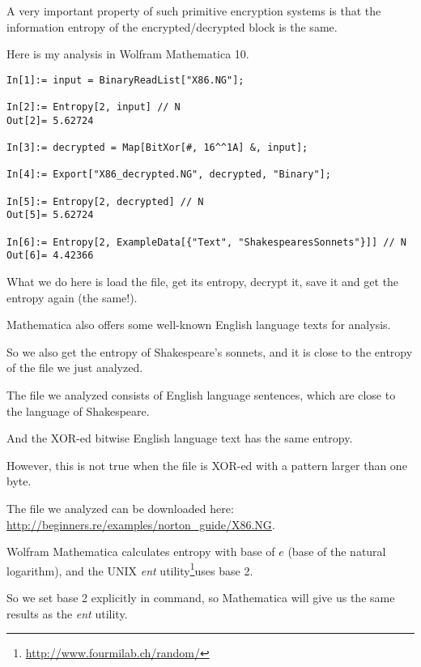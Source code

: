 A very important property of such primitive encryption systems is that the information entropy
of the encrypted/decrypted block is the same.

Here is my analysis in Wolfram Mathematica 10.

\begin{lstlisting}[caption=Wolfram Mathematica 10,style=custommath]
In[1]:= input = BinaryReadList["X86.NG"];

In[2]:= Entropy[2, input] // N
Out[2]= 5.62724

In[3]:= decrypted = Map[BitXor[#, 16^^1A] &, input];

In[4]:= Export["X86_decrypted.NG", decrypted, "Binary"];

In[5]:= Entropy[2, decrypted] // N
Out[5]= 5.62724

In[6]:= Entropy[2, ExampleData[{"Text", "ShakespearesSonnets"}]] // N
Out[6]= 4.42366
\end{lstlisting}

What we do here is load the file, get its entropy, decrypt it, save it and get the entropy again (the same!).

Mathematica also offers some well-known English language texts for analysis.

So we also get the entropy of Shakespeare's sonnets, and it is close to the entropy of the file we just analyzed.

The file we analyzed consists of English language sentences, which are close to the language 
of Shakespeare.

And the XOR-ed bitwise English language text has the same entropy.

However, this is not true when the file is XOR-ed with a pattern larger than one byte.

The file we analyzed can be downloaded here: \url{http://beginners.re/examples/norton_guide/X86.NG}.


\newcommand{\FNENTURL}{\footnote{\url{http://www.fourmilab.ch/random/}}}

Wolfram Mathematica calculates entropy with base of $e$ (base of the natural logarithm),
and the UNIX \emph{ent} utility\FNENTURL uses base 2.

So we set base 2 explicitly in  command, so Mathematica will give us the same results as the \emph{ent} utility.

